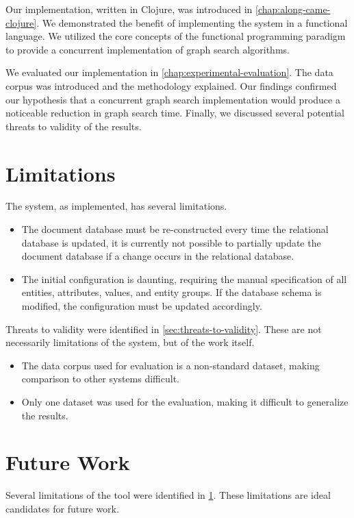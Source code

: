 		Our implementation, written in Clojure, was introduced in \cref{chap:along-came-clojure}.  We demonstrated the benefit of implementing the system in a functional language.  We utilized the core concepts of the functional programming paradigm to provide a concurrent implementation of graph search algorithms.
		
		We evaluated our implementation in \cref{chap:experimental-evaluation}.  The data corpus was introduced and the methodology explained.  Our findings confirmed our hypothesis that a concurrent graph search implementation would produce a noticeable  reduction in graph search time.  Finally, we discussed several potential threats to validity of the results.
	
	\section{Limitations}
	\label{sec:limitations}
		The system, as implemented, has several limitations.
		
		\begin{itemize}
			\item The document database must be re-constructed every time the relational database is updated, it is currently not possible to partially update the document database if a change occurs in the relational database.
			\item The initial configuration is daunting, requiring the manual specification of all entities, attributes, values, and entity groups.  If the database schema is modified, the configuration must be updated accordingly.
		\end{itemize}
		
		Threats to validity were identified in \cref{sec:threats-to-validity}.  These are not necessarily limitations of the system, but of the work itself.
		
		\begin{itemize}
			\item The data corpus used for evaluation is a non-standard dataset, making comparison to other systems difficult.
			\item Only one dataset was used for the evaluation, making it difficult to generalize the results.
		\end{itemize}
	
	\section{Future Work}
		Several limitations of the tool were identified in \cref{sec:limitations}.  These limitations are ideal candidates for future work.
		
